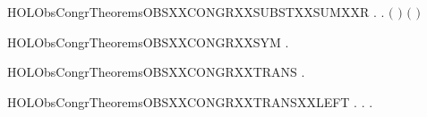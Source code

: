 \newcommand{\HOLObsCongrTheoremsOBSXXCONGRXXSUBSTXXSUMXXL}{\UseVerbatim{HOLObsCongrTheoremsOBSXXCONGRXXSUBSTXXSUMXXL}}
\begin{SaveVerbatim}{HOLObsCongrTheoremsOBSXXCONGRXXSUBSTXXSUMXXR}
\HOLTokenTurnstile{} \HOLSymConst{\HOLTokenForall{}} .    \HOLSymConst{\HOLTokenImp{}} \HOLSymConst{\HOLTokenForall{}}.  \ensuremath{(} \HOLSymConst{\ensuremath{+}} \ensuremath{)} \ensuremath{(} \HOLSymConst{\ensuremath{+}} \ensuremath{)}
\end{SaveVerbatim}
\newcommand{\HOLObsCongrTheoremsOBSXXCONGRXXSUBSTXXSUMXXR}{\UseVerbatim{HOLObsCongrTheoremsOBSXXCONGRXXSUBSTXXSUMXXR}}
\begin{SaveVerbatim}{HOLObsCongrTheoremsOBSXXCONGRXXSYM}
\HOLTokenTurnstile{} \HOLSymConst{\HOLTokenForall{}} .    \HOLSymConst{\HOLTokenImp{}}   
\end{SaveVerbatim}
\newcommand{\HOLObsCongrTheoremsOBSXXCONGRXXSYM}{\UseVerbatim{HOLObsCongrTheoremsOBSXXCONGRXXSYM}}
\begin{SaveVerbatim}{HOLObsCongrTheoremsOBSXXCONGRXXTRANS}
\HOLTokenTurnstile{} \HOLSymConst{\HOLTokenForall{}}  .
          \HOLSymConst{\HOLTokenConj{}}    \HOLSymConst{\HOLTokenImp{}}   
\end{SaveVerbatim}
\newcommand{\HOLObsCongrTheoremsOBSXXCONGRXXTRANS}{\UseVerbatim{HOLObsCongrTheoremsOBSXXCONGRXXTRANS}}
\begin{SaveVerbatim}{HOLObsCongrTheoremsOBSXXCONGRXXTRANSXXLEFT}
\HOLTokenTurnstile{} \HOLSymConst{\HOLTokenForall{}} .
          \HOLSymConst{\HOLTokenImp{}}
       \HOLSymConst{\HOLTokenForall{}} .  \HOLTokenTransBegin{}\HOLTokenTransEnd {} \HOLSymConst{\HOLTokenImp{}} \HOLSymConst{\HOLTokenExists{}}.  \HOLTokenWeakTransBegin{}\HOLTokenWeakTransEnd {} \HOLSymConst{\HOLTokenConj{}}   
\end{SaveVerbatim}
